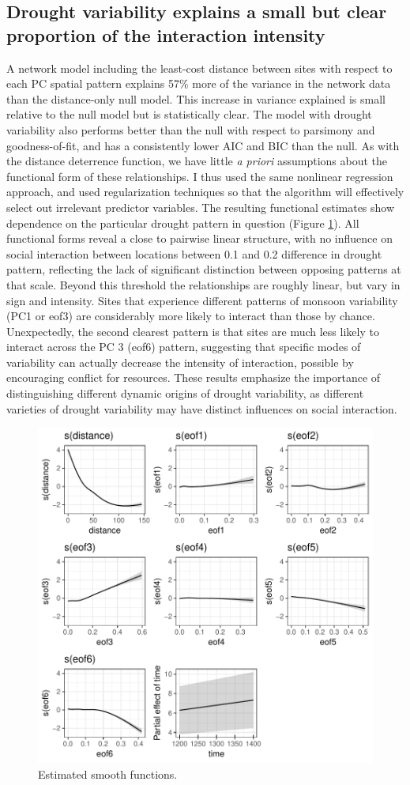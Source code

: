 \documentclass[fleqn,10pt]{wlscirep}
\begin{document}
\subsection*{Drought variability explains a small but clear proportion of the interaction intensity}
A network model including the least-cost distance between sites with respect to each PC spatial pattern explains 57\% more of the variance in the network data than the distance-only null model. This increase in variance explained is small relative to the null model but is statistically clear. The model with drought variability also performs better than the null with respect to parsimony and goodness-of-fit, and has a consistently lower AIC and BIC than the null. As with the distance deterrence function, we have little \textit{a priori} assumptions about the functional form of these relationships. I thus used the same nonlinear regression approach, and used regularization techniques so that the algorithm will effectively select out irrelevant predictor variables. The resulting functional estimates show dependence on the particular drought pattern in question (Figure \ref{fig:smooths}). All functional forms reveal a close to pairwise linear structure, with no influence on social interaction between locations between 0.1 and 0.2 difference in drought pattern, reflecting the lack of significant distinction between opposing patterns at that scale. Beyond this threshold the relationships are roughly linear, but vary in sign and intensity. Sites that experience different patterns of monsoon variability (PC1 or eof3) are considerably more likely to interact than those by chance. Unexpectedly, the second clearest pattern is that sites are much less likely to interact across the PC 3 (eof6) pattern, suggesting that specific modes of variability can actually decrease the intensity of interaction, possible by encouraging conflict for resources. These results emphasize the importance of distinguishing different dynamic origins of drought variability, as different varieties of drought variability may have distinct influences on social interaction.


\begin{figure}[!htbp]
\centering
\includegraphics[width=.6\linewidth]{figures/smooths.pdf}
\caption{Estimated smooth functions.}
\label{fig:smooths}
\end{figure}
\end{document}
